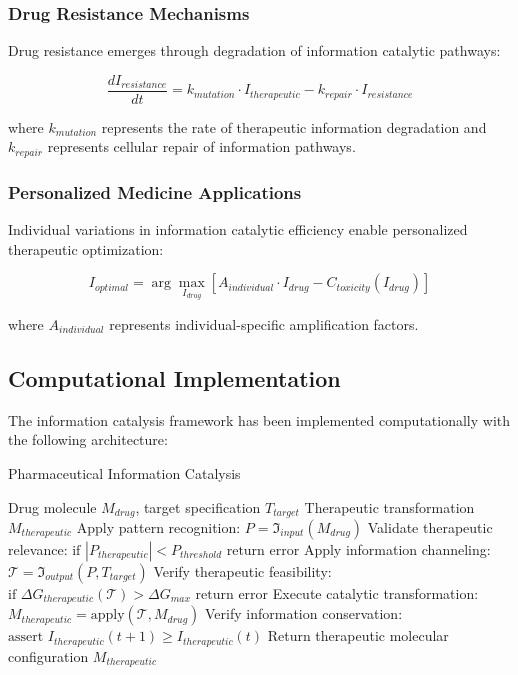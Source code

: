 \subsubsection{Drug Resistance Mechanisms}

Drug resistance emerges through degradation of information catalytic pathways:

\begin{equation}
\frac{dI_{resistance}}{dt} = k_{mutation} \cdot I_{therapeutic} - k_{repair} \cdot I_{resistance}
\end{equation}

where $k_{mutation}$ represents the rate of therapeutic information degradation and $k_{repair}$ represents cellular repair of information pathways.

\subsubsection{Personalized Medicine Applications}

Individual variations in information catalytic efficiency enable personalized therapeutic optimization:

\begin{equation}
I_{optimal} = \arg\max_{I_{drug}} \left[ A_{individual} \cdot I_{drug} - C_{toxicity}(I_{drug}) \right]
\end{equation}

where $A_{individual}$ represents individual-specific amplification factors.

\subsection{Computational Implementation}

The information catalysis framework has been implemented computationally with the following architecture:

\begin{algorithm}[H]
\caption{Pharmaceutical Information Catalysis}
\begin{algorithmic}[1]
\REQUIRE Drug molecule $M_{drug}$, target specification $T_{target}$
\ENSURE Therapeutic transformation $M_{therapeutic}$
\STATE Apply pattern recognition: $P = \mathfrak{I}_{input}(M_{drug})$
\STATE Validate therapeutic relevance: $\text{if } |P_{therapeutic}| < P_{threshold} \text{ return error}$
\STATE Apply information channeling: $\mathcal{T} = \mathfrak{I}_{output}(P, T_{target})$
\STATE Verify therapeutic feasibility: $\text{if } \Delta G_{therapeutic}(\mathcal{T}) > \Delta G_{max} \text{ return error}$
\STATE Execute catalytic transformation: $M_{therapeutic} = \text{apply}(\mathcal{T}, M_{drug})$
\STATE Verify information conservation: $\text{assert } I_{therapeutic}(t+1) \geq I_{therapeutic}(t)$
\STATE Return therapeutic molecular configuration $M_{therapeutic}$
\end{algorithmic}
\end{algorithm}


